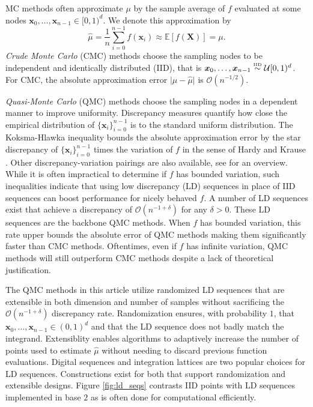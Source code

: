 \documentclass[graybox]{svmult}
\begin{document}
MC methods often approximate $\mu$ by the sample average of $f$ evaluated at some nodes $\boldsymbol{x}_0,\dots,\boldsymbol{x}_{n-1} \in [0,1)^d$. We denote this approximation by  
\begin{equation}
    \label{eq:mcapprox}
    \hat{\mu} = \frac{1}{n}\sum_{i=0}^{n-1} f(\boldsymbol{x}_i) \approx \mathbb{E}[f(\boldsymbol{X})] = \mu. 
\end{equation}
\emph{Crude Monte Carlo} (CMC) methods choose the sampling nodes to be independent and identically distributed (IID), that is $\boldsymbol{x}_0,\dots,\boldsymbol{x}_{n-1} \overset{\text{\tiny IID}}{\sim} \mathcal{U}[0,1)^{d}$. For CMC, the absolute approximation error $\lvert \mu - \hat{\mu} \rvert$ is $\mathcal{O}(n^{-1/2})$. 

\emph{Quasi-Monte Carlo} (QMC) methods choose the sampling nodes in a dependent manner to improve uniformity. Discrepancy measures quantify how close the empirical distribution of $\{\boldsymbol{x}_i\}_{i=0}^{n-1}$ is to the standard uniform distribution. The Koksma-Hlawka inequality bounds the absolute approximation error by the star discrepancy of $\{\boldsymbol{x}_i\}_{i=0}^{n-1}$ times the variation of $f$ in the sense of Hardy and Krause \cite{dick2013high}. Other discrepancy-variation pairings are also available, see \cite{hickernell1998generalized} for an overview. While it is often impractical to determine if $f$ has bounded variation, such inequalities indicate that using low discrepancy (LD) sequences in place of IID sequences can boost performance for nicely behaved $f$. A number of LD sequences exist that achieve a discrepancy of $\mathcal{O}(n^{-1+\delta})$ for any $\delta > 0$. These LD sequences are the backbone QMC methods. When $f$ has bounded variation, this rate upper bounds the absolute error of QMC methods making them significantly faster than CMC methods. Oftentimes, even if $f$ has infinite variation, QMC methods will still outperform CMC methods despite a lack of theoretical justification. 

The QMC methods in this article utilize randomized LD sequences that are extensible in both dimension and number of samples without sacrificing the $\mathcal{O}(n^{-1+\delta})$ discrepancy rate. Randomization ensures, with probability $1$, that $\boldsymbol{x}_0,\dots,\boldsymbol{x}_{n-1} \in (0,1)^d$ and that the LD sequence does not badly match the integrand. Extensiblity enables algorithms to adaptively increase the number of points used to estimate $\hat{\mu}$ without needing to discard previous function evaluations. Digital sequences and integration lattices are two popular choices for LD sequences. Constructions exist for both that support randomization and extensible designs. Figure \ref{fig:ld_seqs} contrasts IID points with LD sequences implemented in base $2$ as is often done for computational efficiently.
\end{document}

